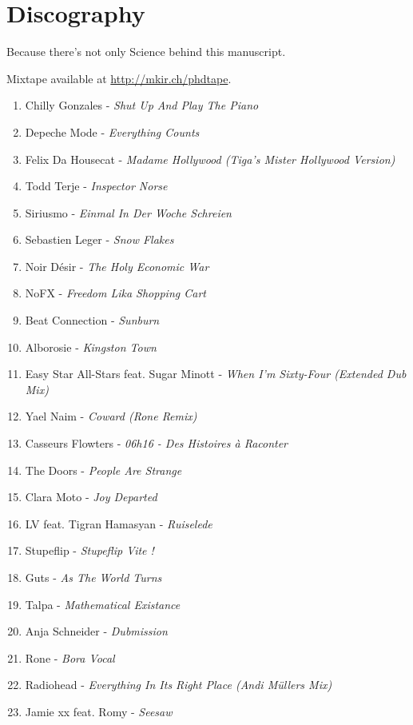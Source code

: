 \chapter*{Discography}
\label{chap:discography}

\begin{paragraph}{}
Because there's not only Science behind this manuscript.
\end{paragraph}
\begin{paragraph}{}
Mixtape available at \url{http://mkir.ch/phdtape}.
\end{paragraph}

\begin{enumerate}
  \setlength\itemsep{0pt}
  \item Chilly Gonzales - \textit{ Shut Up And Play The Piano}
  \item Depeche Mode - \textit{ Everything Counts}
  \item Felix Da Housecat - \textit{ Madame Hollywood (Tiga's Mister Hollywood Version)}
  \item Todd Terje - \textit{ Inspector Norse}
  \item Siriusmo - \textit{ Einmal In Der Woche Schreien}
  \item Sebastien Leger - \textit{ Snow Flakes}
  \item Noir Désir - \textit{ The Holy Economic War}
  \item NoFX - \textit{ Freedom Lika Shopping Cart}
  \item Beat Connection - \textit{ Sunburn}
  \item Alborosie - \textit{ Kingston Town}
  \item Easy Star All-Stars feat. Sugar Minott - \textit{ When I'm Sixty-Four (Extended Dub Mix)}
  \item Yael Naim - \textit{ Coward (Rone Remix)}
  \item Casseurs Flowters - \textit{ 06h16 - Des Histoires à Raconter}
  \item The Doors - \textit{ People Are Strange}
  \item Clara Moto - \textit{ Joy Departed}
  \item LV feat. Tigran Hamasyan - \textit{ Ruiselede}
  \item Stupeflip - \textit{ Stupeflip Vite !}
  \item Guts - \textit{ As The World Turns }
  \item Talpa - \textit{ Mathematical Existance}
  \item Anja Schneider - \textit{ Dubmission}
  \item Rone - \textit{ Bora Vocal}
  \item Radiohead - \textit{ Everything In Its Right Place (Andi Müllers Mix)}
  \item Jamie xx feat. Romy - \textit{ Seesaw}
\end{enumerate}
